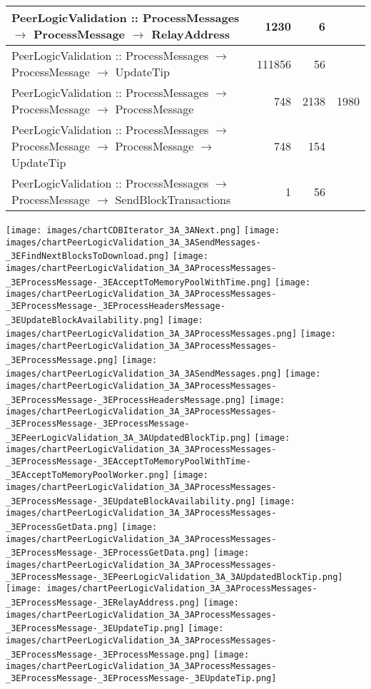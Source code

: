 \documentclass{article}
\begin{document}
\begin{tabular}{P{5cm}|r|r|r}
PeerLogicValidation :: ProcessMessages $\to$ ProcessMessage $\to$ RelayAddress& 1230& 6&\\\hline
PeerLogicValidation :: ProcessMessages $\to$ ProcessMessage $\to$ UpdateTip& 111856& 56&\\\hline
PeerLogicValidation :: ProcessMessages $\to$ ProcessMessage $\to$ ProcessMessage& 748& 2138&1980\\\hline
PeerLogicValidation :: ProcessMessages $\to$ ProcessMessage $\to$ ProcessMessage $\to$ UpdateTip& 748& 154&\\\hline
PeerLogicValidation :: ProcessMessages $\to$ ProcessMessage $\to$ SendBlockTransactions& 1& 56&\\\hline
\end{tabular}

\texttt{[image: images/chartCDBIterator\_3A\_3ANext.png]}
\texttt{[image: images/chartPeerLogicValidation\_3A\_3ASendMessages-\_3EFindNextBlocksToDownload.png]}
\texttt{[image: images/chartPeerLogicValidation\_3A\_3AProcessMessages-\_3EProcessMessage-\_3EAcceptToMemoryPoolWithTime.png]}
\texttt{[image: images/chartPeerLogicValidation\_3A\_3AProcessMessages-\_3EProcessMessage-\_3EProcessHeadersMessage-\_3EUpdateBlockAvailability.png]}
\texttt{[image: images/chartPeerLogicValidation\_3A\_3AProcessMessages.png]}
\texttt{[image: images/chartPeerLogicValidation\_3A\_3AProcessMessages-\_3EProcessMessage.png]}
\texttt{[image: images/chartPeerLogicValidation\_3A\_3ASendMessages.png]}
\texttt{[image: images/chartPeerLogicValidation\_3A\_3AProcessMessages-\_3EProcessMessage-\_3EProcessHeadersMessage.png]}
\texttt{[image: images/chartPeerLogicValidation\_3A\_3AProcessMessages-\_3EProcessMessage-\_3EProcessMessage-\_3EPeerLogicValidation\_3A\_3AUpdatedBlockTip.png]}
\texttt{[image: images/chartPeerLogicValidation\_3A\_3AProcessMessages-\_3EProcessMessage-\_3EAcceptToMemoryPoolWithTime-\_3EAcceptToMemoryPoolWorker.png]}
\texttt{[image: images/chartPeerLogicValidation\_3A\_3AProcessMessages-\_3EProcessMessage-\_3EUpdateBlockAvailability.png]}
\texttt{[image: images/chartPeerLogicValidation\_3A\_3AProcessMessages-\_3EProcessGetData.png]}
\texttt{[image: images/chartPeerLogicValidation\_3A\_3AProcessMessages-\_3EProcessMessage-\_3EProcessGetData.png]}
\texttt{[image: images/chartPeerLogicValidation\_3A\_3AProcessMessages-\_3EProcessMessage-\_3EPeerLogicValidation\_3A\_3AUpdatedBlockTip.png]}
\texttt{[image: images/chartPeerLogicValidation\_3A\_3AProcessMessages-\_3EProcessMessage-\_3ERelayAddress.png]}
\texttt{[image: images/chartPeerLogicValidation\_3A\_3AProcessMessages-\_3EProcessMessage-\_3EUpdateTip.png]}
\texttt{[image: images/chartPeerLogicValidation\_3A\_3AProcessMessages-\_3EProcessMessage-\_3EProcessMessage.png]}
\texttt{[image: images/chartPeerLogicValidation\_3A\_3AProcessMessages-\_3EProcessMessage-\_3EProcessMessage-\_3EUpdateTip.png]}
\end{document}
